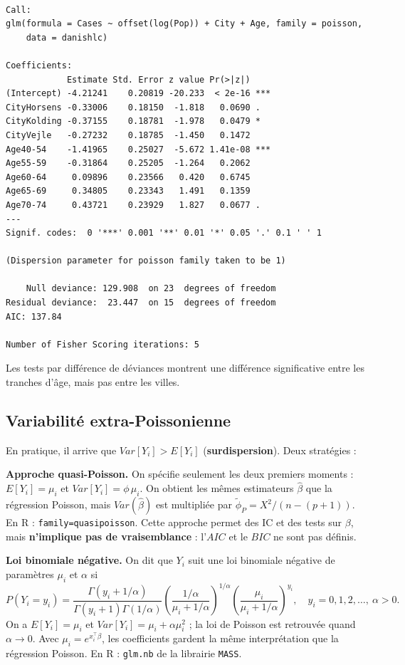 \documentclass[
  french,
  letterpaper,
  DIV=11,
  numbers=noendperiod]{scrreprt}
\begin{document}
\begin{verbatim}

Call:
glm(formula = Cases ~ offset(log(Pop)) + City + Age, family = poisson, 
    data = danishlc)

Coefficients:
            Estimate Std. Error z value Pr(>|z|)    
(Intercept) -4.21241    0.20819 -20.233  < 2e-16 ***
CityHorsens -0.33006    0.18150  -1.818   0.0690 .  
CityKolding -0.37155    0.18781  -1.978   0.0479 *  
CityVejle   -0.27232    0.18785  -1.450   0.1472    
Age40-54    -1.41965    0.25027  -5.672 1.41e-08 ***
Age55-59    -0.31864    0.25205  -1.264   0.2062    
Age60-64     0.09896    0.23566   0.420   0.6745    
Age65-69     0.34805    0.23343   1.491   0.1359    
Age70-74     0.43721    0.23929   1.827   0.0677 .  
---
Signif. codes:  0 '***' 0.001 '**' 0.01 '*' 0.05 '.' 0.1 ' ' 1

(Dispersion parameter for poisson family taken to be 1)

    Null deviance: 129.908  on 23  degrees of freedom
Residual deviance:  23.447  on 15  degrees of freedom
AIC: 137.84

Number of Fisher Scoring iterations: 5
\end{verbatim}

Les tests par différence de déviances montrent une différence
significative entre les tranches d'âge, mais pas entre les villes.

\subsection{Variabilité
extra-Poissonienne}\label{variabilituxe9-extra-poissonienne}

En pratique, il arrive que \(Var[Y_i] > E[Y_i]\)
(\textbf{surdispersion}). Deux stratégies :

\textbf{Approche quasi-Poisson.} On spécifie seulement les deux premiers
moments : \(E[Y_i] = \mu_i\) et \(Var[Y_i] = \phi\,\mu_i\). On obtient
les mêmes estimateurs \(\hat\beta\) que la régression Poisson, mais
\(Var(\hat\beta)\) est multipliée par \(\tilde\phi_P = X^2/(n-(p+1))\).
En R : \texttt{family=quasipoisson}. Cette approche permet des IC et des
tests sur \(\beta\), mais \textbf{n'implique pas de vraisemblance} :
l'\(AIC\) et le \(BIC\) ne sont pas définis.

\textbf{Loi binomiale négative.} On dit que \(Y_i\) suit une loi
binomiale négative de paramètres \(\mu_i\) et \(\alpha\) si
\[P(Y_i = y_i) = \frac{\Gamma(y_i + 1/\alpha)}{\Gamma(y_i+1)\Gamma(1/\alpha)}\left(\frac{1/\alpha}{\mu_i + 1/\alpha}\right)^{1/\alpha}\left(\frac{\mu_i}{\mu_i + 1/\alpha}\right)^{y_i}, \quad y_i = 0,1,2,\ldots,\ \alpha > 0.\]
On a \(E[Y_i] = \mu_i\) et \(Var[Y_i] = \mu_i + \alpha\mu_i^2\) ; la loi
de Poisson est retrouvée quand \(\alpha \to 0\). Avec
\(\mu_i = e^{x_i^\top\beta}\), les coefficients gardent la même
interprétation que la régression Poisson. En R : \texttt{glm.nb} de la
librairie \texttt{MASS}.
\end{document}
